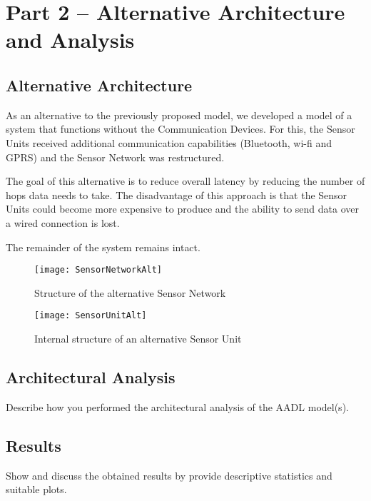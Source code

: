 \section{Part 2 -- Alternative Architecture and Analysis}

\subsection{Alternative Architecture}

As an alternative to the previously proposed model, we developed a model of a system that functions without the Communication Devices.
For this, the Sensor Units received additional communication capabilities (Bluetooth, wi-fi and GPRS) and the Sensor Network was restructured.

The goal of this alternative is to reduce overall latency by reducing the number of hops data needs to take.
The disadvantage of this approach is that the Sensor Units could become more expensive to produce and the ability to send data over a wired connection is lost.

The remainder of the system remains intact. 

\begin{figure*}[h]
\caption{Structure of the alternative Sensor Network}
\label{fig:sensornetworkalt}
\centering
\texttt{[image: SensorNetworkAlt]}
\end{figure*}

\begin{figure*}[h]
\caption{Internal structure of an alternative Sensor Unit}
\label{fig:sensorunitalt}
\centering
\texttt{[image: SensorUnitAlt]}
\end{figure*}

\subsection{Architectural Analysis}

Describe how you performed the architectural analysis of the AADL model(s).

\subsection{Results}

Show and discuss the obtained results by provide descriptive statistics and suitable plots.


